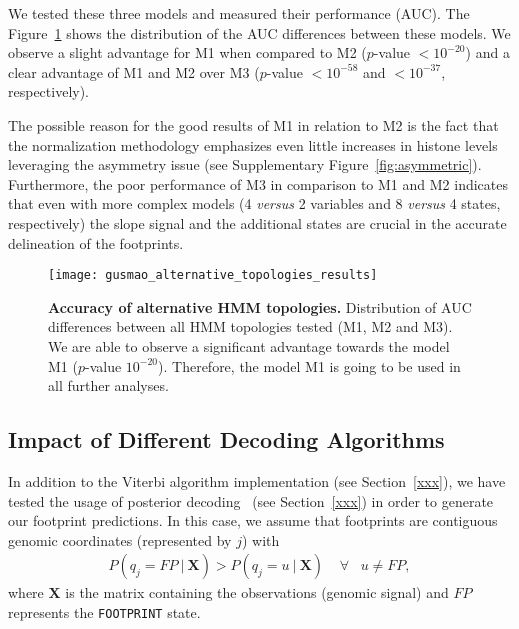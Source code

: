 We tested these three models and measured their performance (AUC). The Figure~\ref{fig:gusmao_alternative_topologies_results} shows the distribution of the AUC differences between these models. We observe a slight advantage for M1 when compared to M2 ($p$-value $ < 10^{-20} $) and a clear advantage of M1 and M2 over M3 ($p$-value $ < 10^{-58} $ and $ < 10^{-37} $, respectively).

The possible reason for the good results of M1 in relation to M2 is the fact that the normalization methodology emphasizes even little increases in histone levels leveraging the asymmetry issue (see Supplementary Figure~\ref{fig:asymmetric}). Furthermore, the poor performance of M3 in comparison to M1 and M2 indicates that even with more complex models (4 \emph{versus} 2 variables and 8 \emph{versus} 4 states, respectively) the slope signal and the additional states are crucial in the accurate delineation of the footprints.

\begin{figure}[h!]
\centering
\texttt{[image: gusmao\_alternative\_topologies\_results]}
\caption[Accuracy of alternative HMM topologies]{\textbf{Accuracy of alternative HMM topologies.} Distribution of AUC differences between all HMM topologies tested (M1, M2 and M3). We are able to observe a significant advantage towards the model M1 ($p$-value $10^{-20}$). Therefore, the model M1 is going to be used in all further analyses.}
\label{fig:gusmao_alternative_topologies_results}
\end{figure}

\subsection{Impact of Different Decoding Algorithms}
\label{sec:impact.different.decoding.algorithms}

In addition to the Viterbi algorithm implementation (see Section~\ref{xxx}), we have tested the usage of posterior decoding~\cite{rabiner1989} (see Section~\ref{xxx}) in order to generate our footprint predictions. In this case, we assume that footprints are contiguous genomic coordinates (represented by $j$) with
\begin{align}
  P(q_{j} = F \! P \: | \: \mathbf{X}) > P(q_{j} = u \: | \: \mathbf{X}) \; \; \; \; \forall \; \; \; u \neq F \! P,
  \label{eq:posterior}
\end{align}
where $ \mathbf{X} $ is the matrix containing the observations (genomic signal) and
$F \! P$ represents the {\tt FOOTPRINT} state.

